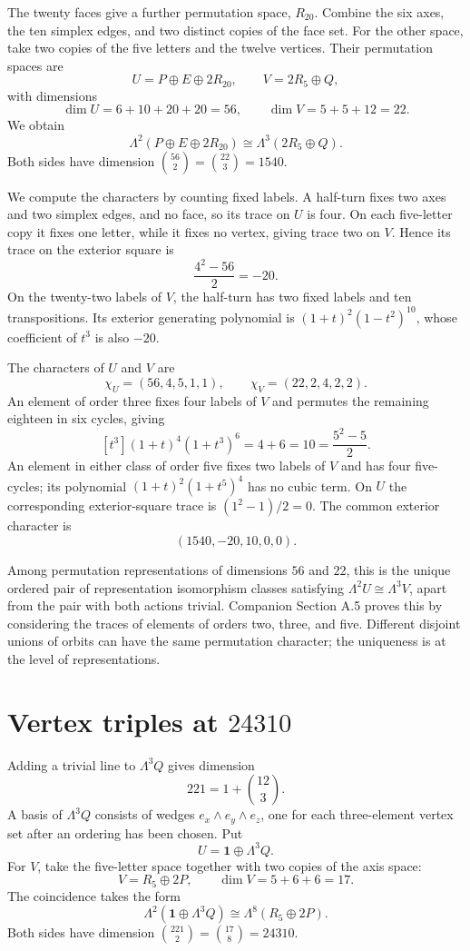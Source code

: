 \documentclass[11pt,a4paper]{article}
\begin{document}
The twenty faces give a further permutation space, $R_{20}$. Combine
the six axes, the ten simplex edges, and two distinct copies of the face
set. For the other space, take two copies of the five letters and the
twelve vertices. Their permutation spaces are
\[
U=P\oplus E\oplus2R_{20},\qquad V=2R_5\oplus Q,
\]
with dimensions
\[
\dim U=6+10+20+20=56,\qquad \dim V=5+5+12=22.
\]
We obtain
\begin{equation}\label{eq:faces-1540}
\boxed{\Lambda^2(P\oplus E\oplus2R_{20})
       \cong\Lambda^3(2R_5\oplus Q).}
\end{equation}
Both sides have dimension $\binom{56}{2}=\binom{22}{3}=1540$.

We compute the characters by counting fixed labels. A half-turn fixes two axes
and two simplex edges, and no face, so its trace on $U$ is four. On each
five-letter copy it fixes one letter, while it fixes no vertex, giving
trace two on $V$. Hence its trace on the exterior square is
\[
\frac{4^2-56}{2}=-20.
\]
On the twenty-two labels of $V$, the half-turn has two fixed labels and ten
transpositions. Its exterior generating polynomial is
$(1+t)^2(1-t^2)^{10}$, whose coefficient of $t^3$ is also $-20$.

The characters of $U$ and $V$ are
\[
\chi_U=(56,4,5,1,1),\qquad \chi_V=(22,2,4,2,2).
\]
An element of order three fixes four labels of $V$ and permutes the
remaining eighteen in six cycles, giving
\[
[t^3](1+t)^4(1+t^3)^6=4+6=10
=\frac{5^2-5}{2}.
\]
An element in either class of order five fixes two labels of $V$ and has
four five-cycles; its polynomial $(1+t)^2(1+t^5)^4$ has no cubic term.
On $U$ the corresponding exterior-square trace is $(1^2-1)/2=0$.
The common exterior character is
\[
(1540,-20,10,0,0).
\]

Among permutation representations of dimensions $56$ and $22$, this is
the unique ordered pair of representation isomorphism classes satisfying
$\Lambda^2U\cong\Lambda^3V$, apart from the pair with both actions
trivial. Companion Section A.5 proves this by considering the traces of elements
of orders two, three, and five. Different disjoint unions of orbits can have the same permutation character;
the uniqueness is at the level of representations.

\section[Vertex triples at 24310]{Vertex triples at $24310$}\label{sec:triples}

Adding a trivial line to $\Lambda^3Q$ gives dimension
\[
221=1+\binom{12}{3}.
\]
A basis of $\Lambda^3Q$ consists of wedges $e_x\wedge e_y\wedge e_z$, one for each three-element vertex set after an ordering has been chosen. Put
\[
U=\mathbf1\oplus\Lambda^3Q.
\]
For $V$, take the five-letter space together with two copies of the axis space:
\[
V=R_5\oplus2P,\qquad \dim V=5+6+6=17.
\]
The coincidence takes the form
\begin{equation}\label{eq:triples-24310}
\boxed{\Lambda^2(\mathbf1\oplus\Lambda^3Q)
        \cong\Lambda^8(R_5\oplus2P).}
\end{equation}
Both sides have dimension $\binom{221}{2}=\binom{17}{8}=24310$.
\end{document}

